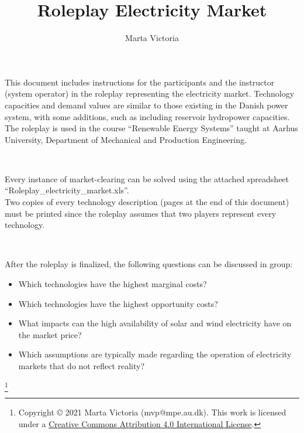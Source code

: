 \documentclass[3p]{elsarticle} %
\newcommand\blfootnote[1]{
  \begingroup
  \renewcommand\thefootnote{}\footnote{#1}
  \addtocounter{footnote}{-1}
  \endgroup
}
\begin{document}
\begin{frontmatter}

\title{ \textbf{Roleplay Electricity Market}}

\author[mymainaddress]{Marta Victoria}
\address[mymainaddress]{Department of Mechanical and Production Engineering, Aarhus University, Inge Lehmanns Gade 10, 8000 Aarhus, Denmark}

\end{frontmatter}
\thispagestyle{fancy}


This document includes instructions for the participants and the instructor (system operator) in the roleplay representing the electricity market. Technology capacities and demand values are similar to those existing in the Danish power system, with some additions, such as including reservoir hydropower capacities. The roleplay is used in the course “Renewable Energy Systems” taught at Aarhus University, Department of Mechanical and Production Engineering.

\

Every instance of market-clearing can be solved using the attached spreadsheet “Roleplay\_electricity\_market.xls”.\\

Two copies of every technology description (pages at the end of this document) must be printed since the roleplay assumes that two players represent every technology.

\

After the roleplay is finalized, the following questions can be discussed in group:

\begin{itemize}
\item Which technologies have the highest marginal costs?
\item Which technologies have the highest opportunity costs?
\item What impacts can the high availability of solar and wind electricity have on the market price?
\item Which assumptions are typically made regarding the operation of electricity markets that do not reflect reality?
\end{itemize}


\blfootnote{Copyright © 2021 Marta Victoria (mvp@mpe.au.dk). This work is licensed under a \href{https://creativecommons.org/licenses/by/4.0/} {Creative Commons Attribution 4.0 International License}.}


\newpage
\end{document}
